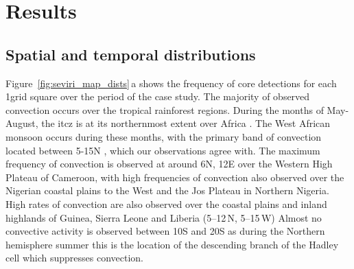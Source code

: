 \section{Results}

\subsection{Spatial and temporal distributions}

Figure~\ref{fig:seviri_map_dists}\,a shows the frequency of core detections for each 1\textdegree grid square over the period of the case study. 
The majority of observed convection occurs over the tropical rainforest regions. 
During the months of May-August, the \acrfull{itcz} is at its northernmost extent over Africa \citep{nicholson_itcz_2018}. 
The West African monsoon occurs during these months, with the primary band of convection located between 5-15\textdegree N \citep{nicholson_revised_2009}, which our observations agree with. 
The maximum frequency of convection is observed at around 6\textdegree N, 12\textdegree E over the Western High Plateau of Cameroon, with high frequencies of convection also observed over the Nigerian coastal plains to the West and the Jos Plateau in Northern Nigeria. 
High rates of convection are also observed over the coastal plains and inland highlands of Guinea, Sierra Leone and Liberia (5--12\,\textdegree N, 5--15\,\textdegree W)
Almost no convective activity is observed between 10\textdegree S and 20\textdegree S as during the Northern hemisphere summer this is the location of the descending branch of the Hadley cell which suppresses convection.


